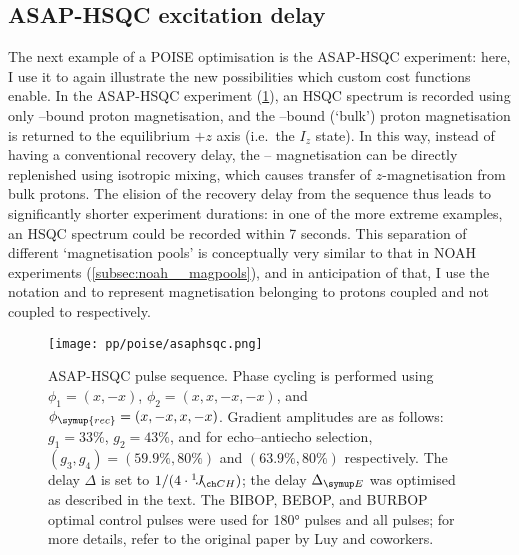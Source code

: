 \subsection{ASAP-HSQC excitation delay}
\label{subsec:poise__asaphsqc}

The next example of a POISE optimisation is the ASAP-HSQC experiment\autocite{SchulzeSunninghausen2014JACS,SchulzeSunninghausen2017JMR}: here, I use it to again illustrate the new possibilities which custom cost functions enable.
In the ASAP-HSQC experiment (\cref{fig:asaphsqc_pulseq}), an HSQC spectrum is recorded using only \carbon{}--bound proton magnetisation, and the \carbont{}--bound (`bulk') proton magnetisation is returned to the equilibrium $+z$ axis (i.e.\ the $I_z$ state).
In this way, instead of having a conventional recovery delay, the \carbon{}--\proton{} magnetisation can be directly replenished using isotropic mixing, which causes transfer of $z$-magnetisation from bulk protons.
The elision of the recovery delay from the sequence thus leads to significantly shorter experiment durations: in one of the more extreme examples, an HSQC spectrum could be recorded within 7 seconds.
This separation of different `magnetisation pools' is conceptually very similar to that in NOAH experiments (\cref{subsec:noah__magpools}), and in anticipation of that, I use the notation  and  to represent magnetisation belonging to protons coupled and not coupled to \carbon{} respectively.

\begin{figure}[htb]
    \centering
    \texttt{[image: pp/poise/asaphsqc.png]}%
    \caption[ASAP-HSQC pulse sequence]{
        ASAP-HSQC pulse sequence.
        Phase cycling is performed using $\phi_1 = (x, -x)$, $\phi_2 = (x, x, -x, -x)$, and $\phi_{\symup{rec}} = (x, -x, x, -x)$.
        Gradient amplitudes are as follows: $g_1 = 33\%$, $g_2 = 43\%$, and for echo--antiecho selection, $(g_3, g_4) = (59.9\%, 80\%)$ and $(63.9\%, 80\%)$ respectively.
        The delay $\Delta$ is set to $1/(4 \cdot \oneJ{CH})$; the delay $\DeltaE$ was optimised as described in the text.
        The BIBOP, BEBOP, and BURBOP optimal control pulses\autocite{Kobzar2004JMR,Kobzar2008JMR,Kobzar2012JMR} were used for \proton{} \ang{180} pulses and all \carbon{} pulses; for more details, refer to the original paper by Luy and coworkers\autocite{SchulzeSunninghausen2014JACS}.
    }
    \label{fig:asaphsqc_pulseq}
\end{figure}

